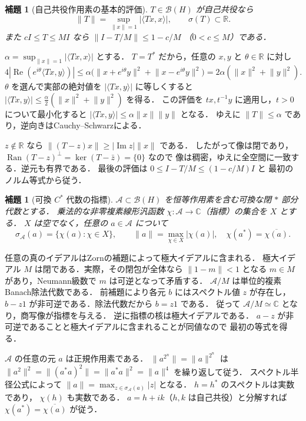 \documentclass[a5paper,10pt,onecolumn]{jsarticle}
\makeatletter
\theoremstyle{mathnotetheorem}
\newtheorem{lemma}[theorem]{補題}
\renewcommand{\proofname}{証明}
\renewenvironment{proof}[1][\proofname]{%
  \par\pushQED{\qed}\normalfont\topsep4\p@\@plus2\p@\relax
  \trivlist\item[\hskip\labelsep\bfseries #1]\ignorespaces
}{\popQED\endtrivlist\@endpefalse}
\newcommand{\norm}[1]{\lVert #1\rVert}
\makeatother
\begin{document}
\begin{lemma}[自己共役作用素の基本的評価]
$T\in\mathcal B(H)$ が自己共役なら
\[
 \norm T=\sup_{\norm x=1}|\langle Tx,x\rangle|,
 \qquad\sigma(T)\subset\mathbb R.
\]
また $cI\le T\le MI$ なら $\norm{I-T/M}\le1-c/M$
（$0<c\le M$）である．
\end{lemma}
\begin{proof}
$\alpha=\sup_{\norm x=1}|\langle Tx,x\rangle|$ とする．
$T=T^*$ だから，任意の $x,y$ と $\theta\in\mathbb R$ に対し
\[
 4|\operatorname{Re}(e^{i\theta}\langle Tx,y\rangle)|
 \le\alpha\bigl(\norm{x+e^{i\theta}y}^2+
                        \norm{x-e^{i\theta}y}^2\bigr)
 =2\alpha(\norm x^2+\norm y^2).
\]
$\theta$ を選んで実部の絶対値を $|\langle Tx,y\rangle|$
に等しくすると
$|\langle Tx,y\rangle|\le\frac\alpha2(\norm x^2+\norm y^2)$ を得る．
この評価を $tx,t^{-1}y$ に適用し，$t>0$ について最小化すると
$|\langle Tx,y\rangle|\le\alpha\norm x\norm y$ となる．
ゆえに $\norm T\le\alpha$ であり，逆向きはCauchy--Schwarzによる．

$z\notin\mathbb R$ なら
$\norm{(T-z)x}\ge|\operatorname{Im}z|\norm x$ である．
したがって像は閉であり，
$\operatorname{Ran}(T-z)^\perp=\ker(T-\bar z)=\{0\}$ なので
像は稠密，ゆえに全空間に一致する．逆元も有界である．
最後の評価は $0\le I-T/M\le(1-c/M)I$ と
最初のノルム等式から従う．
\end{proof}

\begin{lemma}[可換 $C^*$ 代数の指標]
$\mathcal A\subset\mathcal B(H)$ を恒等作用素を含む可換な閉 $*$ 部分代数とする．
乗法的な非零複素線形汎函数
$\chi:\mathcal A\to\mathbb C$（指標）の集合を $X$ とする．
$X$ は空でなく，任意の $a\in\mathcal A$ について
\[
  \sigma_{\mathcal A}(a)=\{\chi(a):\chi\in X\},\qquad
  \norm a=\max_{\chi\in X}|\chi(a)|,
  \quad\chi(a^*)=\overline{\chi(a)}.
\]
\end{lemma}
\begin{proof}
任意の真のイデアルはZornの補題によって極大イデアルに含まれる．
極大イデアル $M$ は閉である．実際，その閉包が全体なら
$\norm{1-m}<1$ となる $m\in M$ があり，Neumann級数で
$m$ は可逆となって矛盾する．
$\mathcal A/M$ は単位的複素Banach除法代数である．
前補題により各元 $b$ にはスペクトル値 $z$ が存在し，
$b-z1$ が非可逆である．除法代数だから $b=z1$ である．
従って $\mathcal A/M\simeq\mathbb C$ となり，商写像が指標を与える．
逆に指標の核は極大イデアルである．
$a-z$ が非可逆であることと極大イデアルに含まれることが同値なので
最初の等式を得る．

$\mathcal A$ の任意の元 $a$ は正規作用素である．
$\norm{a^{2^n}}=\norm a^{2^n}$ は
$\norm{a^2}^2=\norm{(a^*a)^2}=\norm{a^*a}^2=\norm a^4$
を繰り返して従う．
スペクトル半径公式によって
$\norm a=\max_{z\in\sigma_{\mathcal A}(a)}|z|$ となる．
$h=h^*$ のスペクトルは実数であり，
$\chi(h)$ も実数である．
$a=h+ik$（$h,k$ は自己共役）と分解すれば
$\chi(a^*)=\overline{\chi(a)}$ が従う．
\end{proof}
\end{document}
